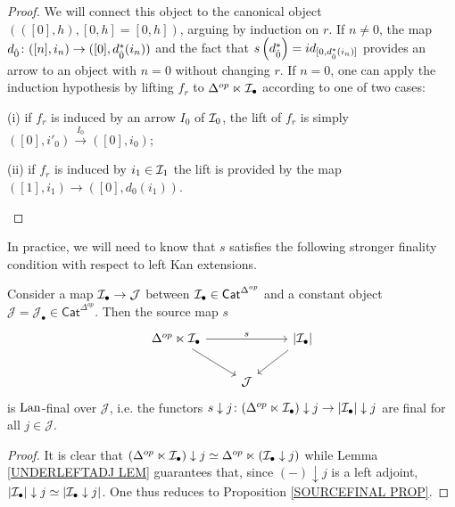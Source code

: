 \documentclass[a4paper,10pt]{article}%
\begin{document}
\begin{proof}
  We will connect this object to the canonical object 
  $\left(([0],h),[0,h]=[0,h]\right)$, arguing by induction on $r$. 
  If $n \neq 0$, the map 
  $d_{\hat{0}} \colon ([n],i_n) \to ([0],d_{\hat{0}}^{\**}(i_n))$
  and the fact that 
  $s \left(d_{\hat{0}}^{\**}\right) = id_{[0, d_{\hat{0}}^{\**}(i_n)]}$ provides an arrow to an object with $n=0$ without changing $r$.
  If $n=0$, one can apply the induction hypothesis by lifting $f_r$ to $\Delta^{op} \ltimes \mathcal{I}_{\bullet}$ according to one of two cases:
  \begin{inparaenum}
  \item[(i)] if $f_r$ is induced by an arrow $I_0$ of $\mathcal{I}_0$, the lift of $f_r$ is simply  
    $([0],i'_0) \xrightarrow {I_0} ([0],i_0)$;
  \item[(ii)] if $f_r$ is induced by $i_1\in \mathcal{I}_1$ the lift is provided by the map
    $([1],i_1) \to ([0],d_0(i_1))$.
  \end{inparaenum}
\end{proof}


In practice, we will need to know that $s$ satisfies the following stronger finality condition with respect to left Kan extensions.


\begin{corollary}\label{SOURCELANFINAL COR}
  Consider a map
  $\mathcal{I}_{\bullet} \to \mathcal{J}$
  between $\mathcal{I}_{\bullet} \in \mathsf{Cat}^{\Delta^{op}}$
  and a constant object
  $\mathcal{J} = \mathcal{J}_{\bullet} \in \mathsf{Cat}^{\Delta^{op}}$. Then the source map $s$
  \[
  \begin{tikzcd}
    \Delta^{op} \ltimes \mcI_{\bullet} \ar{rr}{s}  \ar{rd}&& \left|\mcI_{\bullet} \right|\ar{dl} \\
    & \mathcal{J}
  \end{tikzcd}	
  \]
  is $\operatorname{Lan}$-final over $\mathcal{J}$, i.e. the functors 
  $s \downarrow j\colon (\Delta^{op} \ltimes \mathcal{I}_{\bullet})\downarrow j \to |\mathcal{I}_{\bullet}|\downarrow j$ are final for all $j\in \mathcal{J}$.
\end{corollary}

\begin{proof}
  It is clear that $(\Delta^{op} \ltimes \mathcal{I}_{\bullet})\downarrow j \simeq \Delta^{op} \ltimes ( \mathcal{I}_{\bullet}\downarrow j)$
  while Lemma \ref{UNDERLEFTADJ LEM}
  guarantees that, since $(\minus) \downarrow j$ is a left adjoint, $|\mathcal{I}_{\bullet}|\downarrow j \simeq |\mathcal{I}_{\bullet}\downarrow j |$. One thus reduces to Proposition \ref{SOURCEFINAL PROP}.
\end{proof}
\end{document}
